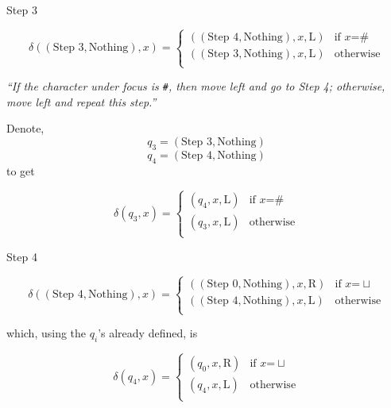 \documentclass[
  ignorenonframetext,
]{beamer}
\begin{document}
\begin{frame}[fragile]{Step 3}
\protect\hypertarget{step-3}{}

\[\delta((\text{Step 3},\text{Nothing}), x) = \begin{cases}
((\text{Step 4},\text{Nothing}),x, \mathrm{L}) & \text{if } x \text{=} \#\\
((\text{Step 3},\text{Nothing}),x, \mathrm{L}) & \text{otherwise}\\
\end{cases}
\]

\emph{``If the character under focus is \texttt{\#}, then move left and
go to Step 4; otherwise, move left and repeat this step.''}

Denote, \[q_3=(\text{Step 3},\text{Nothing})\]
\[q_4=(\text{Step 4},\text{Nothing})\] to get

\[\delta(q_3, x) = \begin{cases}
(q_4 ,x, \mathrm{L}) & \text{if } x \text{=} \#\\
(q_3,x, \mathrm{L}) & \text{otherwise}\\
\end{cases}
\]

\end{frame}

\begin{frame}{Step 4}
\protect\hypertarget{step-4}{}

\[\delta((\text{Step 4},\text{Nothing}), x) = \begin{cases}
((\text{Step 0}, \text{Nothing}),x, \mathrm{R}) & \text{if } x \text{=} \sqcup \\
((\text{Step 4},\text{Nothing}),x, \mathrm{L}) & \text{otherwise}\\
\end{cases}
\]

which, using the \(q_i\)'s already defined, is

\[\delta(q_4, x) = \begin{cases}
(q_0 ,x, \mathrm{R}) & \text{if } x \text{=} \sqcup \\
(q_4,x, \mathrm{L}) & \text{otherwise}\\
\end{cases}
\]

\end{frame}
\end{document}
